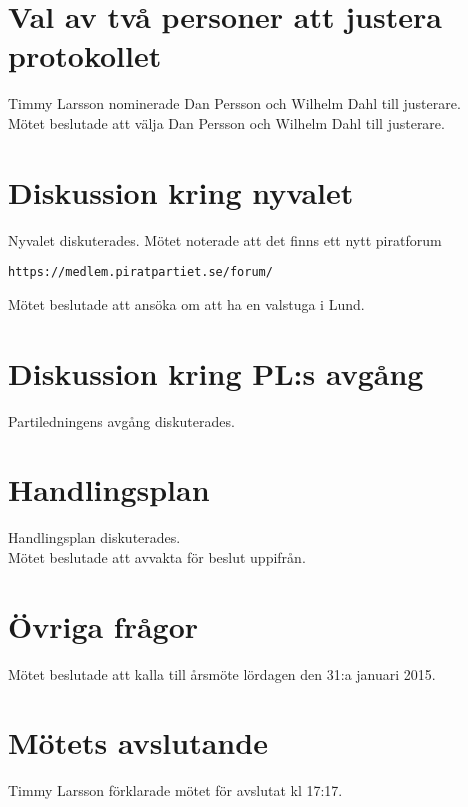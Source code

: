 \documentclass[a4paper,10pt]{article}
\begin{document}
\section{Val av två personer att justera protokollet}
Timmy Larsson nominerade Dan Persson och Wilhelm Dahl till justerare.\\
Mötet beslutade att välja Dan Persson och Wilhelm Dahl till justerare.

\section{Diskussion kring nyvalet}
Nyvalet diskuterades. Mötet noterade att det finns ett nytt piratforum 
\begin{verbatim}
https://medlem.piratpartiet.se/forum/
\end{verbatim}
Mötet beslutade att ansöka om att ha en valstuga i Lund.

\section{Diskussion kring PL:s avgång}
Partiledningens avgång diskuterades.

\section{Handlingsplan}
Handlingsplan diskuterades.\\
Mötet beslutade att avvakta för beslut uppifrån.

\section{Övriga frågor}
Mötet beslutade att kalla till årsmöte lördagen den 31:a januari 2015.

\section{Mötets avslutande}
Timmy Larsson förklarade mötet för avslutat kl 17:17.
\end{document}
